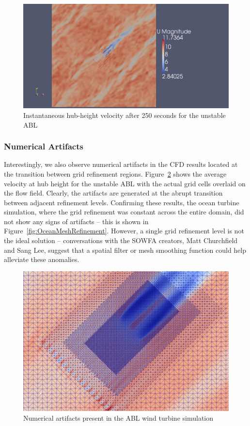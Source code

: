 \begin{figure}
\centering
\includegraphics[width=\textwidth]{images/unstableWindPlantVelPlan}
\caption{Instantaneous hub-height velocity after 250 seconds for the unstable ABL}
\label{fig:unstableWindPlantVelPlan}
\end{figure}

\subsubsection{Numerical Artifacts}
Interestingly, we also observe numerical artifacts in the CFD results located at the transition between grid refinement regions.  Figure~\ref{fig:neutralWindPlantAvgVelPlanMeshRefine} shows the average velocity at hub height for the unstable ABL with the actual grid cells overlaid on the flow field.  Clearly, the artifacts are generated at the abrupt transition between adjacent refinement levels.   Confirming these results, the ocean turbine simulation, where the grid refinement was constant across the entire domain, did not show any signs of artifacts -- this is shown in Figure~\ref{fig:OceanMeshRefinement}. However, a single grid refinement level is not the ideal solution -- conversations with the SOWFA creators, Matt Churchfield and Sang Lee, suggest that a spatial filter or mesh smoothing function could help alleviate these anomalies.

\begin{figure}
\centering
\includegraphics[width=\textwidth]{images/neutralWindPlantAvgVelPlanMeshRefine}
\caption{Numerical artifacts present in the ABL wind turbine simulation}
\label{fig:neutralWindPlantAvgVelPlanMeshRefine}
\end{figure}

